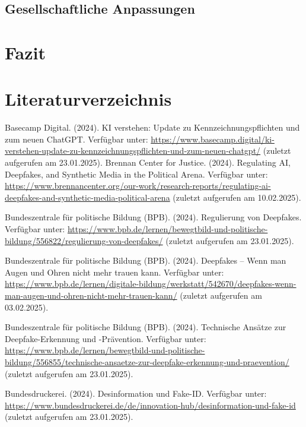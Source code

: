 \documentclass[a4paper,12pt]{article}
\begin{document}
\subsection{Gesellschaftliche Anpassungen}

\newpage

\section{Fazit}



\newpage
{}
\section*{Literaturverzeichnis}
\begin{thebibliography}{99}
 Basecamp Digital. (2024). KI verstehen: Update zu Kennzeichnungspflichten und zum neuen ChatGPT.
Verfügbar unter: \url{https://www.basecamp.digital/ki-verstehen-update-zu-kennzeichnungspflichten-und-zum-neuen-chatgpt/} (zuletzt aufgerufen am 23.01.2025).
 Brennan Center for Justice. (2024). Regulating AI, Deepfakes, and Synthetic Media in the Political Arena.  
Verfügbar unter: \url{https://www.brennancenter.org/our-work/research-reports/regulating-ai-deepfakes-and-synthetic-media-political-arena} (zuletzt aufgerufen am 10.02.2025).

 Bundeszentrale für politische Bildung (BPB). (2024). Regulierung von Deepfakes. 
Verfügbar unter: \url{https://www.bpb.de/lernen/bewegtbild-und-politische-bildung/556822/regulierung-von-deepfakes/} (zuletzt aufgerufen am 23.01.2025).

 Bundeszentrale für politische Bildung (BPB). (2024). Deepfakes – Wenn man Augen und Ohren nicht mehr trauen kann. 
Verfügbar unter: \url{https://www.bpb.de/lernen/digitale-bildung/werkstatt/542670/deepfakes-wenn-man-augen-und-ohren-nicht-mehr-trauen-kann/} (zuletzt aufgerufen am 03.02.2025).

 Bundeszentrale für politische Bildung (BPB). (2024). Technische Ansätze zur Deepfake-Erkennung und -Prävention. 
Verfügbar unter: \url{https://www.bpb.de/lernen/bewegtbild-und-politische-bildung/556855/technische-ansaetze-zur-deepfake-erkennung-und-praevention/} (zuletzt aufgerufen am 23.01.2025).

 Bundesdruckerei. (2024). Desinformation und Fake-ID. 
Verfügbar unter: \url{https://www.bundesdruckerei.de/de/innovation-hub/desinformation-und-fake-id} (zuletzt aufgerufen am 23.01.2025).


\end{thebibliography}
\end{document}
